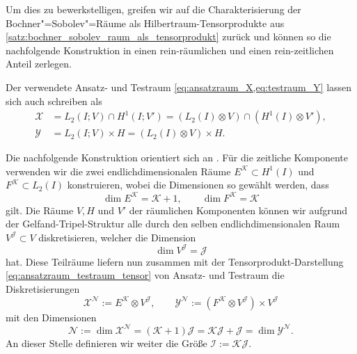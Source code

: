 \documentclass[../main.tex]{subfiles}
\begin{document}
Um dies zu bewerkstelligen, greifen wir auf die Charakterisierung der Bochner"=Sobolev"=Räume als Hilbertraum-Tensorprodukte aus \cref{satz:bochner_sobolev_raum_als_tensorprodukt} zurück und können so die nachfolgende Konstruktion in einen rein-räumlichen und einen rein-zeitlichen Anteil zerlegen.

\begin{Korollar}
    Der verwendete Ansatz- und Testraum \cref{eq:ansatzraum_X,eq:testraum_Y} lassen sich auch schreiben als
    \begin{equation}
        \label{eq:ansatzraum_testraum_tensor}
        \begin{aligned}
        \mathcal X &= L_{2}(I; V) \cap H^{1}(I; V')
            = (L_2(I) \otimes V) \cap (H^{1}(I) \otimes V'),\\
        \mathcal Y &= L_{2}(I; V) \times H = (L_{2}(I) \otimes V) \times H.
        \end{aligned}
    \end{equation}
\end{Korollar}

Die nachfolgende Konstruktion orientiert sich an \cite{Andreev:2012uh}.
Für die zeitliche Komponente verwenden wir die zwei endlichdimensionalen Räume $E^{\mathcal K} \subset H^{1}(I)$ und $F^{\mathcal K} \subset L_{2}(I)$ konstruieren, wobei die Dimensionen so gewählt werden, dass
\begin{equation}
    \label{eq:dimensionen_zeitliche_raeume}
    \dim E^{\mathcal K} = \mathcal K + 1, \qquad \dim F^{\mathcal K} = \mathcal K
\end{equation}
gilt.
Die Räume $V, H$ und $V'$ der räumlichen Komponenten können wir aufgrund der Gelfand-Tripel-Struktur alle durch den selben endlichdimensionalen Raum $V^{\mathcal J} \subset V$ diskretisieren, welcher die Dimension
\begin{equation}
    \label{eq:dimension_raeumliche_raeume}
    \dim V^{\mathcal J} = \mathcal J
\end{equation}
hat.
Diese Teilräume liefern nun zusammen mit der Tensorprodukt-Darstellung \cref{eq:ansatzraum_testraum_tensor} von Ansatz- und Testraum die Diskretisierungen
\begin{equation}
\label{eq:diskrete_tensor_raueme}
    \mathcal X^{\mathcal N} := E^{\mathcal K} \otimes V^{\mathcal J}, \qquad \mathcal Y^{\mathcal N} := (F^{\mathcal K} \otimes V^{\mathcal J}) \times V^{\mathcal J}
\end{equation}
mit den Dimensionen
\begin{equation}
    \mathcal N := \dim \mathcal X^{\mathcal N} = (\mathcal K + 1) \mathcal J = \mathcal K \mathcal J + \mathcal J = \dim \mathcal Y^{\mathcal N}.
\end{equation}
An dieser Stelle definieren wir weiter die Größe $\mathcal I := \mathcal K \mathcal J$.
\end{document}
